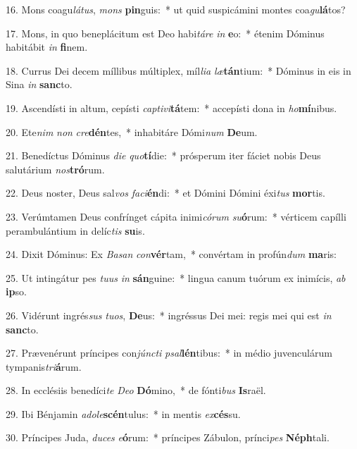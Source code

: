 16. Mons coagu\textit{lá}\textit{tus}, \textit{mons} \textbf{pin}guis:~*  ut quid suspicámini montes coa\textit{gu}\textbf{lá}tos?\

17. Mons, in quo beneplácitum est Deo habi\textit{tá}\textit{re} \textit{in} \textbf{e}o:~*  étenim Dóminus habitábit \textit{in} \textbf{fi}nem.\

18. Currus Dei decem míllibus múltiplex, míl\textit{li}\textit{a} \textit{læ}\textbf{tán}tium:~*  Dóminus in eis in Sina \textit{in} \textbf{sanc}to.\

19. Ascendísti in altum, cepísti \textit{cap}\textit{ti}\textit{vi}\textbf{tá}tem:~*  accepísti dona in \textit{ho}\textbf{mí}nibus.\

20. Ete\textit{nim} \textit{non} \textit{cre}\textbf{dén}tes,~*  inhabitáre Dómi\textit{num} \textbf{De}um.\

21. Benedíctus Dóminus \textit{di}\textit{e} \textit{quo}\textbf{tí}die:~*  prósperum iter fáciet nobis Deus salutárium \textit{nos}\textbf{tró}rum.\

22. Deus noster, Deus sal\textit{vos} \textit{fa}\textit{ci}\textbf{én}di:~*  et Dómini Dómini éxi\textit{tus} \textbf{mor}tis.\

23. Verúmtamen Deus confrínget cápita inimi\textit{có}\textit{rum} \textit{su}\textbf{ó}rum:~*  vérticem capílli perambulántium in delíc\textit{tis} \textbf{su}is.\

24. Dixit Dóminus: Ex \textit{Ba}\textit{san} \textit{con}\textbf{vér}tam,~*  convértam in profún\textit{dum} \textbf{ma}ris:\

25. Ut intingátur pes \textit{tu}\textit{us} \textit{in} \textbf{sán}guine:~*  lingua canum tuórum ex inimícis, \textit{ab} \textbf{ip}so.\

26. Vidérunt ingrés\textit{sus} \textit{tu}\textit{os}, \textbf{De}us:~*  ingréssus Dei mei: regis mei qui est \textit{in} \textbf{sanc}to.\

27. Prævenérunt príncipes con\textit{júnc}\textit{ti} \textit{psal}\textbf{lén}tibus:~*  in médio juvenculárum tympanis\textit{tri}\textbf{á}rum.\

28. In ecclésiis benedíci\textit{te} \textit{De}\textit{o} \textbf{Dó}mino,~*  de fónti\textit{bus} \textbf{Is}raël.\

29. Ibi Bénjamin \textit{ad}\textit{o}\textit{le}\textbf{scén}tulus:~*  in mentis \textit{ex}\textbf{cés}su.\

30. Príncipes Juda, \textit{du}\textit{ces} \textit{e}\textbf{ó}rum:~*  príncipes Zábulon, prínci\textit{pes} \textbf{Néph}tali.\

